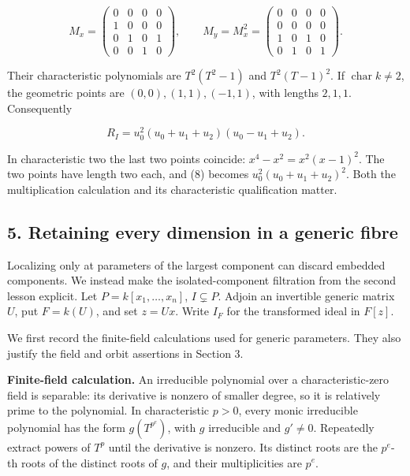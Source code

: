 \documentclass[
]{article}
\begin{document}
\[
M_x=\begin{pmatrix}0&0&0&0\\1&0&0&0\\0&1&0&1\\0&0&1&0\end{pmatrix},
\qquad
M_y=M_x^2=\begin{pmatrix}0&0&0&0\\0&0&0&0\\1&0&1&0\\0&1&0&1\end{pmatrix}.
\]

Their characteristic polynomials are \(T^2(T^2-1)\) and \(T^2(T-1)^2\).
If \(\operatorname{char}k\ne2\), the geometric points are
\((0,0),(1,1),(-1,1)\), with lengths \(2,1,1\). Consequently

\[
R_I=u_0^2(u_0+u_1+u_2)(u_0-u_1+u_2).
\tag{8}
\]

In characteristic two the last two points coincide:
\(x^4-x^2=x^2(x-1)^2\). The two points have length two each, and (8)
becomes \(u_0^2(u_0+u_1+u_2)^2\). Both the multiplication calculation
and its characteristic qualification matter.

\subsection{5. Retaining every dimension in a generic
fibre}\label{retaining-every-dimension-in-a-generic-fibre}

Localizing only at parameters of the largest component can discard
embedded components. We instead make the isolated-component filtration
from the second lesson explicit. Let \(P=k[x_1,\ldots,x_n]\),
\(I\subsetneq P\). Adjoin an invertible generic matrix \(U\), put
\(F=k(U)\), and set \(z=Ux\). Write \(I_F\) for the transformed ideal in
\(F[z]\).

We first record the finite-field calculations used for generic
parameters. They also justify the field and orbit assertions in Section
3.

\textbf{Finite-field calculation.} An irreducible polynomial over a
characteristic-zero field is separable: its derivative is nonzero of
smaller degree, so it is relatively prime to the polynomial. In
characteristic \(p>0\), every monic irreducible polynomial has the form
\(g(T^{p^e})\), with \(g\) irreducible and \(g'\ne0\). Repeatedly
extract powers of \(T^p\) until the derivative is nonzero. Its distinct
roots are the \(p^e\)-th roots of the distinct roots of \(g\), and their
multiplicities are \(p^e\).
\end{document}
